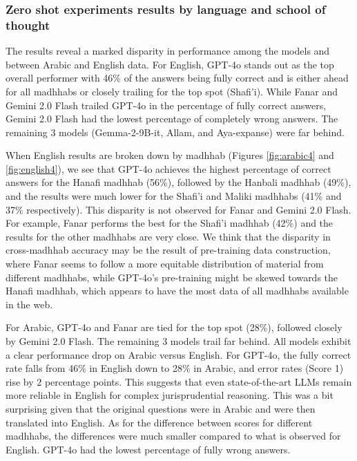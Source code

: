 \documentclass[letterpaper]{article}
\begin{document}
\subsubsection{Zero shot experiments results by language and school of thought}

The results reveal a marked disparity in performance among the models and between Arabic and English data. For English, GPT-4o stands out as the top overall performer with 46\% of the answers being fully correct and is either ahead for all madhhabs or closely trailing for the top spot (Shafi'i).  While Fanar and Gemini 2.0 Flash trailed GPT-4o in the percentage of fully correct answers, Gemini 2.0 Flash had the lowest percentage of completely wrong answers. The remaining 3 models (Gemma-2-9B-it, Allam, and Aya-expanse) were far behind.

When English results are broken down by madhhab (Figures \ref{fig:arabic4} and \ref{fig:english4}), we see that GPT-4o achieves the highest percentage of correct answers for the Hanafi madhhab (56\%), followed by the Hanbali madhhab (49\%), and the results were much lower for the Shafi'i and Maliki madhhabs (41\% and 37\% respectively). This disparity is not observed for Fanar and Gemini 2.0 Flash.  For example, Fanar performs the best for the Shafi'i madhhab (42\%) and the results for the other madhhabs are very close.  We think that the disparity in cross-madhhab accuracy may be the result of pre-training data construction, where Fanar seems to follow a more equitable distribution of material from different madhhabs, while GPT-4o's pre-training might be skewed towards the Hanafi madhhab, which appears to have the most data of all madhhabs available in the web. %


For Arabic, GPT-4o and Fanar are tied for the top spot (28\%), followed closely by Gemini 2.0 Flash.  The remaining 3 models trail far behind.  All models exhibit a clear performance drop on Arabic versus English. For GPT-4o, the fully correct rate falls from 46\% in English down to 28\% in Arabic, and error rates (Score 1) rise by 2 percentage points. This suggests that even state-of-the-art LLMs remain more reliable in English for complex jurisprudential reasoning.  This was a bit surprising given that the original questions were in Arabic and were then translated into English.  As for the difference between scores for different madhhabs, the differences were much smaller compared to what is observed for English.  GPT-4o had the lowest percentage of fully wrong answers.
  
\end{document}
